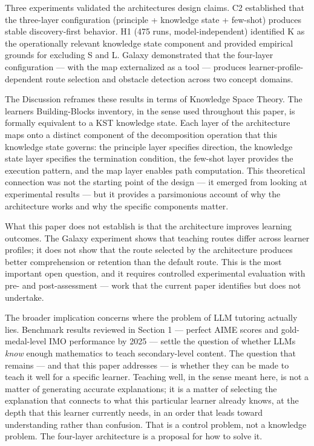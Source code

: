 \documentclass[
]{article}
\begin{document}
Three experiments validated the architecture\textquotesingle s design claims. C2 established that the three-layer configuration (principle + knowledge state + few-shot) produces stable discovery-first behavior. H1 (475 runs, model-independent) identified K as the operationally relevant knowledge state component and provided empirical grounds for excluding S and L. Galaxy demonstrated that the four-layer configuration --- with the map externalized as a tool --- produces learner-profile-dependent route selection and obstacle detection across two concept domains.

The Discussion reframes these results in terms of Knowledge Space Theory. The learner\textquotesingle s Building-Blocks inventory, in the sense used throughout this paper, is formally equivalent to a KST knowledge state. Each layer of the architecture maps onto a distinct component of the decomposition operation that this knowledge state governs: the principle layer specifies direction, the knowledge state layer specifies the termination condition, the few-shot layer provides the execution pattern, and the map layer enables path computation. This theoretical connection was not the starting point of the design --- it emerged from looking at experimental results --- but it provides a parsimonious account of why the architecture works and why the specific components matter.

What this paper does not establish is that the architecture improves learning outcomes. The Galaxy experiment shows that teaching routes differ across learner profiles; it does not show that the route selected by the architecture produces better comprehension or retention than the default route. This is the most important open question, and it requires controlled experimental evaluation with pre- and post-assessment --- work that the current paper identifies but does not undertake.

The broader implication concerns where the problem of LLM tutoring actually lies. Benchmark results reviewed in Section 1 --- perfect AIME scores and gold-medal-level IMO performance by 2025 --- settle the question of whether LLMs \emph{know} enough mathematics to teach secondary-level content. The question that remains --- and that this paper addresses --- is whether they can be made to teach it well for a specific learner. Teaching well, in the sense meant here, is not a matter of generating accurate explanations; it is a matter of selecting the explanation that connects to what this particular learner already knows, at the depth that this learner currently needs, in an order that leads toward understanding rather than confusion. That is a control problem, not a knowledge problem. The four-layer architecture is a proposal for how to solve it.
\end{document}
